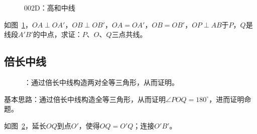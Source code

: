 

\begin{figure}[htbp]
  \centering
  \caption{002D：高和中线} \label{fig:002D}
\end{figure}

如图~\ref{fig:002D}，$OA \perp OA'$，$OB \perp OB'$，$OA = OA'$，$OB = OB'$，$OP \perp AB$于$P$，$Q$是线段$A'B'$的中点，求证：$P$、$O$、$Q$三点共线。

\subsection{倍长中线} \label{subsec:002D-mid}

\begin{figure}[htbp]
  \centering
  \caption{：通过倍长中线构造两对全等三角形，从而证明。}
  \label{fig:002D-mid}
\end{figure}

基本思路：通过倍长中线构造全等三角形，从而证明$\angle POQ = 180^\circ$，进而证明命题。

如图~\ref{fig:002D-mid}，延长$OQ$到点$O'$，使得$OQ = O'Q$；连接$O'B'$。

